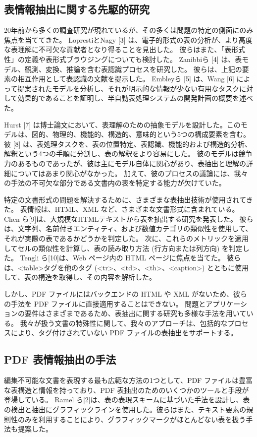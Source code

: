 \documentclass[uplatex, twocolumn,10pt]{jsarticle}
\begin{document}
\subsection{表情報抽出に関する先駆的研究}
20年前から多くの調査研究が現れているが、その多くは問題の特定の側面にのみ焦点を当ててきた。
LoprestiとNagy [3] は、電子的形式の表の分析が、より高度な表理解に不可欠な貢献者となり得ることを見出した。
彼らはまた、「表形式性」の定義や表形式ブラウジングについても検討した。
Zanibbiら [4] は、表モデル、観測、変換、推論を含む表認識プロセスを研究した。
彼らは、上記の要素の相互作用として表認識の文献を提示した。
Embleyら [5] は、Wang [6] によって提案されたモデルを分析し、それが明示的な情報が少ない有用なタスクに対して効果的であることを証明し、半自動表処理システムの開発計画の概要を述べた。

Hurst [7] は博士論文において、表理解のための抽象モデルを設計した。このモデルは、図的、物理的、機能的、構造的、意味的という5つの構成要素を含む。
彼 [8] は、表処理タスクを、表の位置特定、表認識、機能的および構造的分析、解釈という4つの手順に分割し、表の解釈をより容易にした。
彼のモデルは競争力のあるものであったが、彼は主にモデル自体に関心があり、表抽出と理解の詳細についてはあまり関心がなかった。
加えて、彼のプロセスの議論には、我々の手法の不可欠な部分である文書内の表を特定する能力が欠けていた。

特定の文書形式の問題を解決するために、さまざまな表抽出技術が使用されてきた。
表情報は、HTML、XML など、さまざまな文書形式に含まれている。
Chen ら[9]は、大規模なHTMLテキストから表を抽出する研究を発表した。
彼らは、文字列、名前付きエンティティ、および数値カテゴリの類似性を使用して、それが実際の表であるかどうかを判定した。
次に、これらのメトリックを適用してセルの類似性を計算し、表の読み取り方法 (行方向または列方向) を判定した。
Tengli ら[10]は、Web ページ内の HTML ページに焦点を当てた。
彼らは、<table>タグを他のタグ (<tr>、<td>、<th>、<caption>) とともに使用して、表の構造を取得し、その内容を解析した。

しかし、PDF ファイルにはバックエンドの HTML や XML がないため、彼らの手法を PDF ファイルに直接適用することはできない。
問題とアプリケーションの要件はさまざまであるため、表抽出に関する研究も多様な手法を用いている。
我々が扱う文書の特殊性に関して、我々のアプローチは、包括的なプロセスにより、タグ付けされていない PDF ファイルの表抽出をサポートする。

\subsection{PDF 表情報抽出の手法}
編集不可能な文書を表現する最も広範な方法の1つとして、PDF ファイルは豊富な表構造と情報を持っており、PDF 表抽出のためのいくつかのツールと手段が登場している。
Ramel ら[2]は、表の表現スキームに基づいた手法を設計し、表の検出と抽出にグラフィックラインを使用した。彼らはまた、テキスト要素の規則性のみを利用することにより、グラフィックマークがほとんどない表を扱う手法も提案した。
\end{document}
